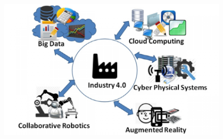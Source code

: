 \documentclass[12pt, a4paper, oneside]{book}
\begin{document}
\begin{figure}[H]
	\centering
	\includegraphics[width=13cm]{Immagini/IND40}
	\caption{}
	\label{HMI40}
\end{figure}
\end{document}
